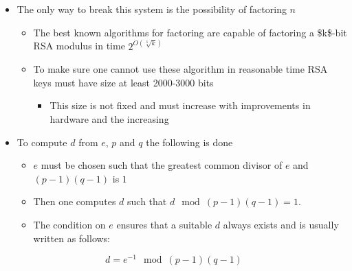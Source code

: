 \documentclass[11pt]{article}
\begin{document}
\begin{itemize}
\item The only way to break this system is the possibility of factoring \(n\)
\begin{itemize}
\item The best known algorithms for factoring are capable of factoring a \$k\$-bit RSA modulus in time \(2^{O(\sqrt[3]k)}\)
\item To make sure one cannot use these algorithm in reasonable time RSA keys must have size at least 2000-3000 bits
\begin{itemize}
\item This size is not fixed and must increase with improvements in hardware and the increasing
\end{itemize}
\end{itemize}

\item To compute \(d\) from \(e\), \(p\) and \(q\) the following is done
\begin{itemize}
\item \(e\) must be chosen such that the greatest common divisor of \(e\) and \((p - 1)(q - 1)\) is \(1\)
\item Then one computes \(d\) such that \(d \mod (p - 1)(q - 1) = 1\).
\item The condition on \(e\) ensures that a suitable \(d\) always exists and is usually written as follows:
\end{itemize}
\end{itemize}
\begin{equation}
  d = e^{-1} \mod (p - 1)(q - 1)
\end{equation}
\end{document}
